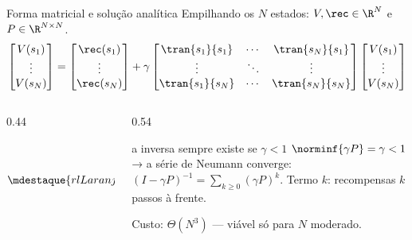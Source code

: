 \documentclass[aspectratio=169, 11pt]{beamer}
\begin{document}
\begin{frame}{Forma matricial e solução analítica}
  Empilhando os $N$ estados: $V, \rec \in \R^N$ e $P \in \R^{N \times N}$.
  \vspace{-0.2em}
  \[
    \begin{bmatrix} V(s_1) \\ \vdots \\ V(s_N) \end{bmatrix}
    =
    \begin{bmatrix} \rec(s_1) \\ \vdots \\ \rec(s_N) \end{bmatrix}
    + \gamma
    \begin{bmatrix}
      \tran{s_1}{s_1} & \cdots & \tran{s_N}{s_1} \\
      \vdots & \ddots & \vdots \\
      \tran{s_1}{s_N} & \cdots & \tran{s_N}{s_N}
    \end{bmatrix}
    \begin{bmatrix} V(s_1) \\ \vdots \\ V(s_N) \end{bmatrix}
  \]
  \vspace{-0.6em}
  \begin{columns}[c]
    \begin{column}{0.44\textwidth}
      \[
        \begin{aligned}
          V &= \rec + \gamma P V \\
          (I - \gamma P)\, V &= \rec \\[0.3em]
          \mdestaque{rlLaranja}{V = (I - \gamma P)^{-1} \rec}
        \end{aligned}
      \]
    \end{column}
    \begin{column}{0.54\textwidth}
      \begin{teobox}{a inversa sempre existe se $\gamma<1$}
        $\norminf{\gamma P} = \gamma < 1$ → a série de Neumann converge:
        $(I-\gamma P)^{-1} = \sum_{k \ge 0} (\gamma P)^k$.
        Termo $k$: recompensas $k$ passos à frente.
      \end{teobox}
      {\small Custo: $\Theta(N^3)$ --- viável só para $N$ moderado.}
    \end{column}
  \end{columns}
\end{frame}
\end{document}
